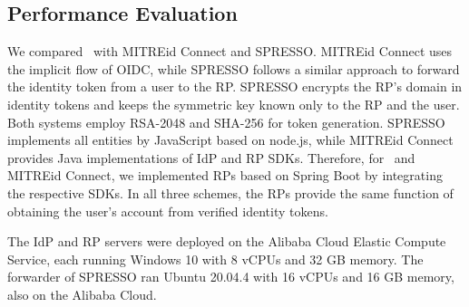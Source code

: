 \subsection{Performance Evaluation}
\label{sec:evaluation}


 We compared \usso~with MITREid Connect and SPRESSO. MITREid Connect uses the implicit flow of OIDC, while SPRESSO follows a similar approach to forward the identity token from a user to the RP. SPRESSO encrypts the RP's domain in identity tokens and keeps the symmetric key known only to the RP and the user. Both systems employ RSA-2048 and SHA-256 for token generation. 
SPRESSO implements all entities by JavaScript based on node.js, while MITREid Connect provides Java implementations of IdP and RP SDKs. Therefore, for \usso~and MITREid Connect, we implemented RPs based on Spring Boot by integrating the respective SDKs. In all three schemes, the RPs provide the same function of obtaining the user's account from verified identity tokens.

The IdP and RP servers were deployed on the Alibaba Cloud Elastic Compute Service, each running Windows 10 with 8 vCPUs and 32 GB memory. The forwarder of SPRESSO ran Ubuntu 20.04.4 with 16 vCPUs and 16 GB memory, also on the Alibaba Cloud.

